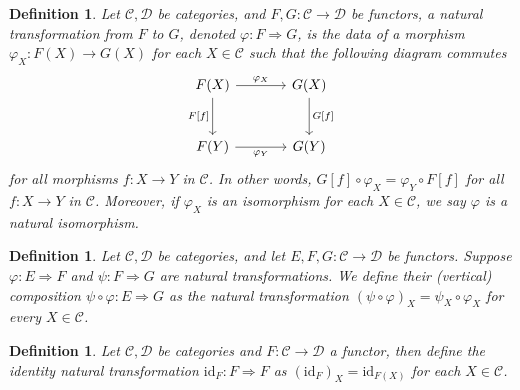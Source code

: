 \documentclass[10pt]{book}
\theoremstyle{bookplain}
\theoremstyle{bookdefinition}
\newtheorem{definition}[theorem]{Definition}
\theoremstyle{bookremark}
\begin{document}
\fi 
\begin{definition}Let $\mathscr{C},\mathscr{D}$ be categories, and $F,G:\mathscr{C}\rightarrow \mathscr{D}$ be functors, a \textit{natural transformation} from $F$ to $G$, denoted $\varphi:F\Rightarrow G$, is the data of a morphism $\varphi_X:F(X)\rightarrow G(X)$ for each $X\in \mathscr{C}$ such that the following diagram commutes
\[\begin{tikzcd}[sep=large]
	F(X) & G(X) \\
	F(Y) & G(Y)
	\arrow["\varphi_X", from=1-1, to=1-2]
	\arrow["F {[ f ]} "', from=1-1, to=2-1]
	\arrow["G {[ f ]}", from=1-2, to=2-2]
	\arrow["\varphi_Y"', from=2-1, to=2-2]
\end{tikzcd}\]
for all morphisms $f:X\rightarrow Y$ in $\mathscr{C}$. In other words, $G[f]\circ \varphi_X=\varphi_Y\circ F[f]$ for all $f:X\rightarrow Y$ in $\mathscr{C}$. 
Moreover, if $\varphi_X$ is an isomorphism for each $X\in\mathscr{C}$, we say $\varphi$ is a \textit{natural isomorphism}. 
\end{definition}

\begin{definition}Let $\mathscr{C},\mathscr{D}$ be categories, and let $E,F,G:\mathscr{C}\rightarrow\mathscr{D}$ be functors. Suppose $\varphi:E\Rightarrow F$ and $\psi:F\Rightarrow G$  are natural transformations. We define their \textit{(vertical) composition} $\psi\circ \varphi:E\Rightarrow G$ as the natural transformation $(\psi\circ \varphi)_X=\psi_X\circ \varphi_X$ for every $X\in\mathscr{C}$. 
\end{definition}

\begin{definition}Let $\mathscr{C},\mathscr{D}$ be categories and $F:\mathscr{C}\rightarrow \mathscr{D}$ a functor, then define the \textit{identity natural transformation} $\mathrm{id}_{F}:F\Rightarrow F$ as  $(\mathrm{id}_{F})_X=\mathrm{id}_{F(X)}$ for each $X\in\mathscr{C}$. 
\end{definition}
\end{document}
